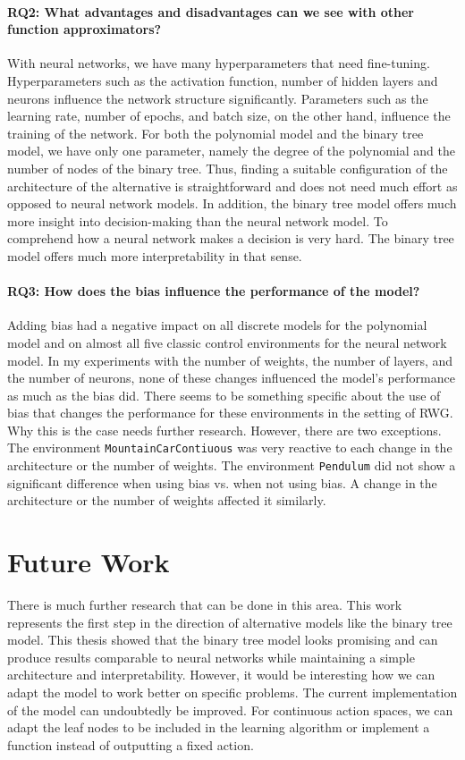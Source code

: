 \paragraph*{RQ2: What advantages and disadvantages can we see with other function approximators?} With neural networks, we have many hyperparameters that need fine-tuning. Hyperparameters such as the activation function, number of hidden layers and neurons influence the network structure significantly. Parameters such as the learning rate, number of epochs, and batch size, on the other hand, influence the training of the network. For both the polynomial model and the binary tree model, we have only one parameter, namely the degree of the polynomial and the number of nodes of the binary tree. Thus, finding a suitable configuration of the architecture of the alternative is straightforward and does not need much effort as opposed to neural network models. In addition, the binary tree model offers much more insight into decision-making than the neural network model. To comprehend how a neural network makes a decision is very hard. The binary tree model offers much more interpretability in that sense.

\paragraph{RQ3: How does the bias influence the performance of the model?} Adding bias had a negative impact on all discrete models for the polynomial model and on almost all five classic control environments for the neural network model. In my experiments with the number of weights, the number of layers, and the number of neurons, none of these changes influenced the model's performance as much as the bias did. There seems to be something specific about the use of bias that changes the performance for these environments in the setting of RWG. Why this is the case needs further research. However, there are two exceptions. The environment \verb|MountainCarContiuous| was very reactive to each change in the architecture or the number of weights. The environment \verb|Pendulum| did not show a significant difference when using bias vs. when not using bias. A change in the architecture or the number of weights affected it similarly.


\section{Future Work}
There is much further research that can be done in this area. This work represents the first step in the direction of alternative models like the binary tree model. This thesis showed that the binary tree model looks promising and can produce results comparable to neural networks while maintaining a simple architecture and interpretability. However, it would be interesting how we can adapt the model to work better on specific problems. The current implementation of the model can undoubtedly be improved. For continuous action spaces, we can adapt the leaf nodes to be included in the learning algorithm or implement a function instead of outputting a fixed action.

